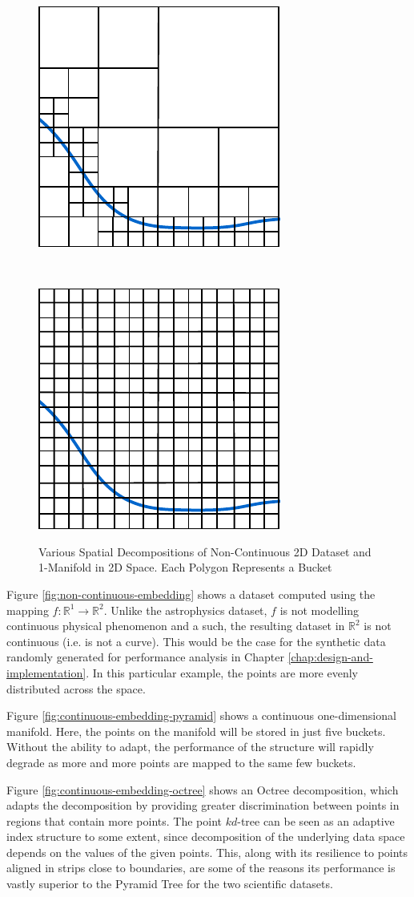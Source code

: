 \begin{figure}
\begin{center}
\begin{subfloat}{%
			\includegraphics[scale=0.65]{figures/1d_manifold_octree.pdf}
		}
		\end{subfloat}~~~~~
		\begin{subfloat}{%
			\includegraphics[scale=0.65]{figures/1d_manifold_multigrid.pdf}
		}
		\end{subfloat}
	\end{center}

	\caption{Various Spatial Decompositions of Non-Continuous 2D Dataset and 1-Manifold in 2D Space. Each Polygon Represents a Bucket}
	\label{fig:static-adaptive-decomposition}
\end{figure}

Figure \ref{fig:non-continuous-embedding} shows a dataset computed using the mapping $f : \mathbb{R}^1 \rightarrow \mathbb{R}^2$. Unlike the astrophysics dataset, $f$ is not modelling continuous physical phenomenon and a such, the resulting dataset in $\mathbb{R}^2$ is not continuous (i.e. is not a curve). This would be the case for the synthetic data randomly generated for performance analysis in Chapter \ref{chap:design-and-implementation}. In this particular example, the points are more evenly distributed across the space.

Figure \ref{fig:continuous-embedding-pyramid} shows a continuous one-dimensional manifold. Here, the points on the manifold will be stored in just five buckets. Without the ability to adapt, the performance of the structure will rapidly degrade as more and more points are mapped to the same few buckets.

Figure \ref{fig:continuous-embedding-octree} shows an Octree decomposition, which adapts the decomposition by providing greater discrimination between points in regions that contain more points. The point $kd$-tree can be seen as an adaptive index structure to some extent, since decomposition of the underlying data space depends on the values of the given points. This, along with its resilience to points aligned in strips close to boundaries, are some of the reasons its performance is vastly superior to the Pyramid Tree for the two scientific datasets.


